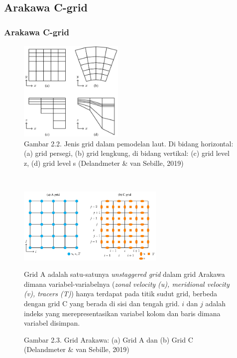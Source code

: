 \documentclass{beamer}
\begin{document}
\subsection{Arakawa C-grid}
\begin{frame}[allowframebreaks]
	\frametitle{Arakawa C-grid}	

	\begin{figure}[H]
	\centering
	\includegraphics[width=5cm]{grid.jpg}
	\captionsetup{labelformat=empty}
	\caption{Gambar 2.2. Jenis grid dalam pemodelan laut. Di bidang horizontal: (a) grid persegi, (b) grid lengkung, di bidang vertikal: (c) grid level z, (d) grid level s (Delandmeter \& van Sebille, 2019)}
	\label{fig:grid}
	\end{figure}
	$\;$ \\
	\begin{figure}[H]
		\centering
		\includegraphics[width=7cm]{arakawa.jpg}
		\captionsetup{labelformat=empty}
		\caption{Gambar 2.3. Grid Arakawa: (a) Grid A dan (b) Grid C (Delandmeter \& van Sebille, 2019)}
			\label{fig:arakawa}
			\tiny
			Grid A adalah satu-satunya \textit{unstaggered grid} dalam grid Arakawa dimana variabel-variabelnya (\textit{zonal velocity (u), meridional velocity (v), tracers (T)}) hanya terdapat pada titik sudut grid, berbeda dengan grid C yang berada di sisi dan tengah grid. $i$ dan $j$ adalah indeks yang merepresentasikan variabel kolom dan baris dimana variabel disimpan.
	\end{figure}	
\end{frame}
\end{document}
